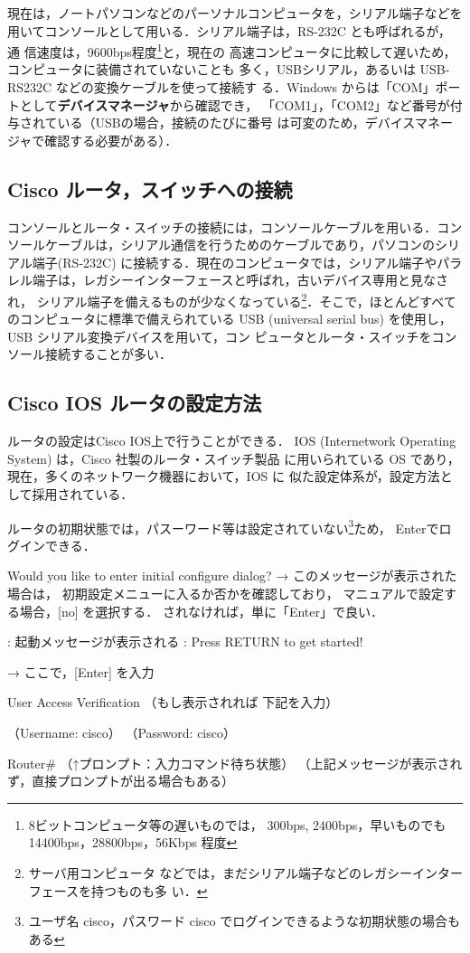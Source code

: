 現在は，ノートパソコンなどのパーソナルコンピュータを，シリアル端子などを
用いてコンソールとして用いる．シリアル端子は，RS-232C とも呼ばれるが，通
信速度は，9600bps程度\footnote{8ビットコンピュータ等の遅いものでは，
300bps, 2400bps，早いものでも 14400bps，28800bps，56Kbps 程度}と，現在の
高速コンピュータに比較して遅いため，コンピュータに装備されていないことも
多く，USBシリアル，あるいは USB-RS232C などの変換ケーブルを使って接続す
る．Windows からは「COM」ポートとして\textbf{デバイスマネージャ}から確認でき，
「COM1」，「COM2」など番号が付与されている（USBの場合，接続のたびに番号
は可変のため，デバイスマネージャで確認する必要がある）．


\subsection{Cisco ルータ，スイッチへの接続}
コンソールとルータ・スイッチの接続には，コンソールケーブルを用いる．コン
ソールケーブルは，シリアル通信を行うためのケーブルであり，パソコンのシリ
アル端子(RS-232C) に接続する．現在のコンピュータでは，シリアル端子やパラ
レル端子は，レガシーインターフェースと呼ばれ，古いデバイス専用と見なされ，
シリアル端子を備えるものが少なくなっている\footnote{サーバ用コンピュータ
などでは，まだシリアル端子などのレガシーインターフェースを持つものも多
い．}．そこで，ほとんどすべてのコンピュータに標準で備えられている USB
(universal serial bus) を使用し，USB シリアル変換デバイスを用いて，コン
ピュータとルータ・スイッチをコンソール接続することが多い．

\subsection{Cisco IOS ルータの設定方法}
ルータの設定はCisco IOS上で行うことができる．
IOS (Internetwork Operating System) は，Cisco 社製のルータ・スイッチ製品
に用いられている OS であり，現在，多くのネットワーク機器において，IOS に
似た設定体系が，設定方法として採用されている．

ルータの初期状態では，パスーワード等は設定されていない\footnote{ユーザ名
cisco，パスワード cisco でログインできるような初期状態の場合もある}ため，
Enterでログインできる．

\begin{cli}
Would you like to enter initial configure dialog?
   → このメッセージが表示された場合は，
      初期設定メニューに入るか否かを確認しており，
      マニュアルで設定する場合，[no] を選択する．
    されなければ，単に「Enter」で良い．

     : 起動メッセージが表示される
     :
Press RETURN to get started!

  → ここで，[Enter] を入力

User Access Verification （もし表示されれば
                            下記を入力）

（Username: cisco）
（Password: cisco）

Router#
（↑プロンプト：入力コマンド待ち状態）
（上記メッセージが表示されず，直接プロンプトが出る場合もある）
\end{cli}

